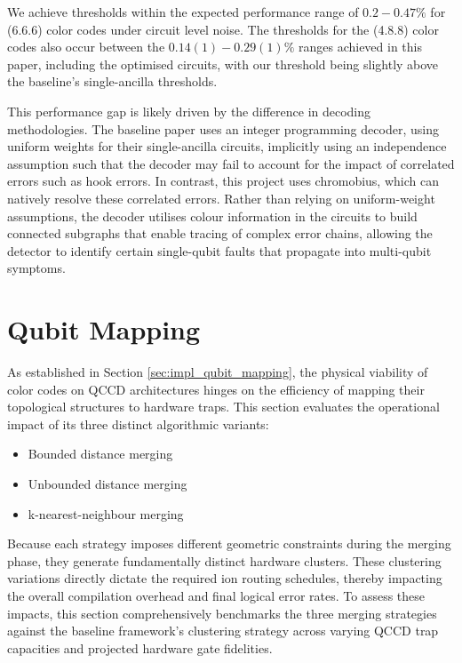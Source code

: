 We achieve thresholds within the expected performance range of $0.2-0.47\%$ for (6.6.6) color codes under circuit level noise. The thresholds for the (4.8.8) color codes also occur between the $0.14(1) - 0.29(1)\%$ ranges achieved in this paper, including the optimised circuits, with our threshold being slightly above the baseline's single-ancilla thresholds.

This performance gap is likely driven by the difference in decoding methodologies. The baseline paper uses an integer programming decoder, using uniform weights for their single-ancilla circuits, implicitly using an independence assumption such that the decoder may fail to account for the impact of correlated errors such as hook errors. In contrast, this project uses chromobius, which can natively resolve these correlated errors. Rather than relying on uniform-weight assumptions, the decoder utilises colour information in the circuits to build connected subgraphs that enable tracing of complex error chains, allowing the detector to identify certain single-qubit faults that propagate into multi-qubit symptoms.

\section{Qubit Mapping}
\label{sec:qubit_mapping_eval}
As established in Section \ref{sec:impl_qubit_mapping}, the physical viability of color codes on QCCD architectures hinges on the efficiency of mapping their topological structures to hardware traps. This section evaluates the operational impact of its three distinct algorithmic variants: \begin{itemize}
    \item Bounded distance merging
    \item Unbounded distance merging
    \item k-nearest-neighbour merging
\end{itemize}

Because each strategy imposes different geometric constraints during the merging phase, they generate fundamentally distinct hardware clusters. These clustering variations directly dictate the required ion routing schedules, thereby impacting the overall compilation overhead and final logical error rates. To assess these impacts, this section comprehensively benchmarks the three merging strategies against the baseline framework's clustering strategy across varying QCCD trap capacities and projected hardware gate fidelities.

